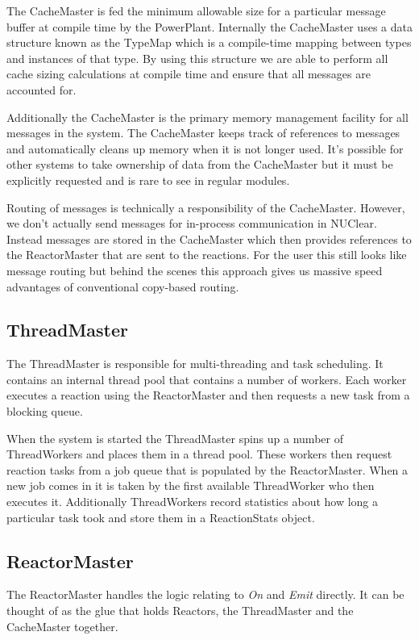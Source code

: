 \documentclass[english,12pt]{scrartcl}
\begin{document}
				The CacheMaster is fed the minimum allowable size for a particular message buffer at compile time by the PowerPlant.
				Internally the CacheMaster uses a data structure known as the TypeMap which is a compile-time mapping between types and instances of that type.
				By using this structure we are able to perform all cache sizing calculations at compile time and ensure that all messages are accounted for.

				Additionally the CacheMaster is the primary memory management facility for all messages in the system.
				The CacheMaster keeps track of references to messages and automatically cleans up memory when it is not longer used.
				It's possible for other systems to take ownership of data from the CacheMaster but it must be explicitly requested and is rare to see in regular modules.

				Routing of messages is technically a responsibility of the CacheMaster.
				However, we don't actually send messages for in-process communication in NUClear.
				Instead messages are stored in the CacheMaster which then provides references to the ReactorMaster that are sent to the reactions.
				For the user this still looks like message routing but behind the scenes this approach gives us massive speed advantages of conventional copy-based routing.

			\subsection{ThreadMaster}
				The ThreadMaster is responsible for multi-threading and task scheduling.
				It contains an internal thread pool that contains a number of workers.
				Each worker executes a reaction using the ReactorMaster and then requests a new task from a blocking queue.

				When the system is started the ThreadMaster spins up a number of ThreadWorkers and places them in a thread pool.
				These workers then request reaction tasks from a job queue that is populated by the ReactorMaster.
				When a new job comes in it is taken by the first available ThreadWorker who then executes it.
				Additionally ThreadWorkers record statistics about how long a particular task took and store them in a ReactionStats object.

			\subsection{ReactorMaster}
				The ReactorMaster handles the logic relating to \emph{On} and \emph{Emit} directly.
				It can be thought of as the glue that holds Reactors, the ThreadMaster and the CacheMaster together.
\end{document}
